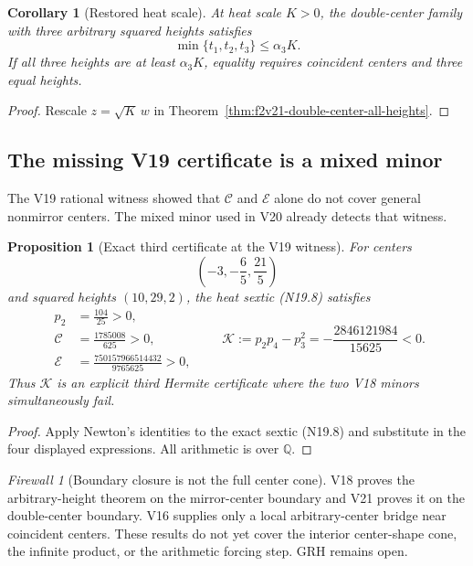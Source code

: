 \documentclass[11pt]{article}
\newtheorem{proposition}[theorem]{Proposition}
\newtheorem{corollary}[theorem]{Corollary}
\theoremstyle{definition}
\theoremstyle{remark}
\newtheorem{firewall}[theorem]{Firewall}
\begin{document}
\begin{corollary}[Restored heat scale]
\label{cor:f2v21-scale}
At heat scale \(K>0\), the double-center family with three arbitrary
squared heights satisfies
\[
 \min\{t_1,t_2,t_3\}\leq\alpha_3K.
 \tag{N21.29}
\]
If all three heights are at least \(\alpha_3K\), equality requires
coincident centers and three equal heights.
\end{corollary}

\begin{proof}
Rescale \(z=\sqrt K\,w\) in
Theorem~\ref{thm:f2v21-double-center-all-heights}.
\end{proof}

\subsection{The missing V19 certificate is a mixed minor}
\label{subsec:f2v21-v19-witness}

The V19 rational witness showed that \(\mathcal C\) and \(\mathcal E\)
alone do not cover general nonmirror centers.  The mixed minor used in V20
already detects that witness.

\begin{proposition}[Exact third certificate at the V19 witness]
\label{prop:f2v21-third-certificate}
For centers
\[
 \left(-3,-\frac65,\frac{21}{5}\right)
 \tag{N21.30}
\]
and squared heights \((10,29,2)\), the heat sextic \textup{(N19.8)}
satisfies
\[
\begin{aligned}
 p_2&=\frac{104}{25}>0,\\
 \mathcal C&=\frac{1785008}{625}>0,\\
 \mathcal E&=\frac{750157966514432}{9765625}>0,
\end{aligned}
\qquad
 \mathcal K:=p_2p_4-p_3^2
 =-\frac{2846121984}{15625}<0.
 \tag{N21.31}
\]
Thus \(\mathcal K\) is an explicit third Hermite certificate where the
two V18 minors simultaneously fail.
\end{proposition}

\begin{proof}
Apply Newton's identities to the exact sextic \textup{(N19.8)} and
substitute in the four displayed expressions.  All arithmetic is over
\(\mathbb Q\).
\end{proof}

\begin{firewall}[Boundary closure is not the full center cone]
\label{fire:f2v21}
V18 proves the arbitrary-height theorem on the mirror-center boundary and
V21 proves it on the double-center boundary.  V16 supplies only a local
arbitrary-center bridge near coincident centers.  These results do not yet
cover the interior center-shape cone, the infinite product, or the
arithmetic forcing step.  GRH remains open.
\end{firewall}
\end{document}
